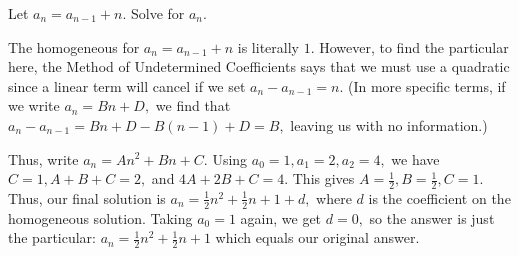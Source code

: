 \documentclass[11pt,twosided]{article}
\begin{document}
 Let $a_n=a_{n-1}+n.$ Solve for $a_n.$

\solution The homogeneous for $a_n=a_{n-1}+n$ is literally $1$. However, to find the particular here, the Method of Undetermined Coefficients says that we must use a quadratic since a linear term will cancel if we set $a_n-a_{n-1}=n.$ (In more specific terms, if we write $a_n=Bn+D,$ we find that $a_n-a_{n-1}=Bn+D-B(n-1)+D=B,$ leaving us with no information.)

Thus, write $a_n=An^2+Bn+C.$ Using $a_0=1, a_1=2, a_2=4,$ we have $C=1, A+B+C=2,$ and $4A+2B+C=4.$ This gives $A=\frac{1}{2}, B=\frac{1}{2}, C=1.$ Thus, our final solution is $a_n=\frac{1}{2}n^2+\frac{1}{2}n+1+d,$ where $d$ is the coefficient on the homogeneous solution. Taking $a_0=1$ again, we get $d=0,$ so the answer is just the particular: $a_n=\boxed{\frac{1}{2}n^2+\frac{1}{2}n+1}$ which equals our original answer.
\end{document}
